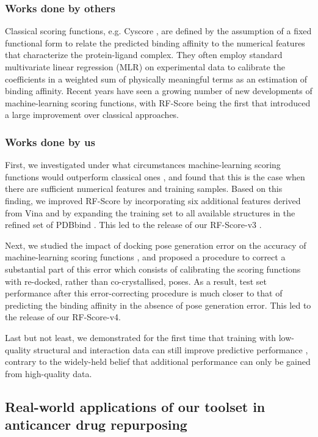 \documentclass[a4paper,12pt]{article}
\begin{document}
\subsubsection*{Works done by others}

Classical scoring functions, e.g. Cyscore \cite{1372}, are defined by the assumption of a fixed functional form to relate the predicted binding affinity to the numerical features that characterize the protein-ligand complex. They often employ standard multivariate linear regression (MLR) on experimental data to calibrate the coefficients in a weighted sum of physically meaningful terms as an estimation of binding affinity. Recent years have seen a growing number of new developments of machine-learning scoring functions, with RF-Score \cite{564} being the first that introduced a large improvement over classical approaches.

\subsubsection*{Works done by us}

First, we investigated under what circumstances machine-learning scoring functions would outperform classical ones \cite{1432}, and found that this is the case when there are sufficient numerical features and training samples. Based on this finding, we improved RF-Score by incorporating six additional features derived from Vina \cite{595} and by expanding the training set to all available structures in the refined set of PDBbind \cite{1633}. This led to the release of our RF-Score-v3 \cite{1647}.

Next, we studied the impact of docking pose generation error on the accuracy of machine-learning scoring functions \cite{1434}, and proposed a procedure to correct a substantial part of this error which consists of calibrating the scoring functions with re-docked, rather than co-crystallised, poses. As a result, test set performance after this error-correcting procedure is much closer to that of predicting the binding affinity in the absence of pose generation error. This led to the release of our RF-Score-v4.

Last but not least, we demonstrated for the first time that training with low-quality structural and interaction data can still improve predictive performance \cite{1663}, contrary to the widely-held belief that additional performance can only be gained from high-quality data.

\subsection*{Real-world applications of our toolset in anticancer drug repurposing}
\end{document}
